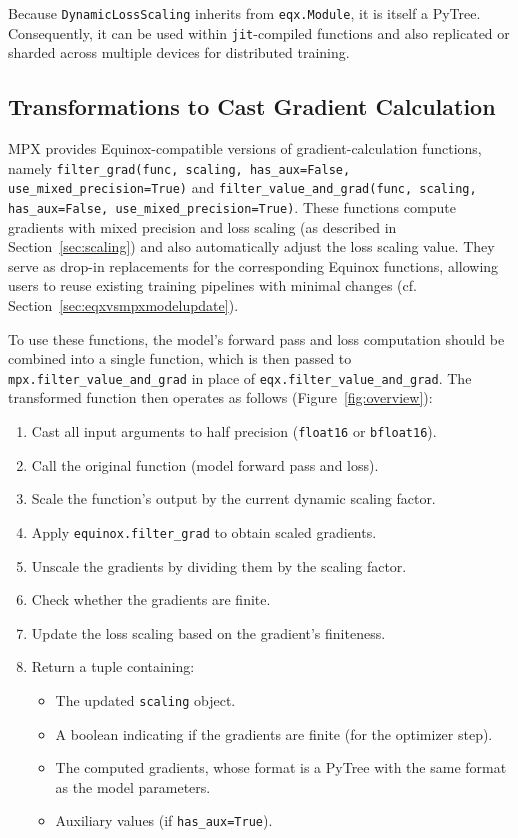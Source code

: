 \documentclass[10pt, a4paper, logo, onecolumn, internal, copyright]{dsme}
\newcommand{\mpx}{\textsc{MPX}}
\begin{document}
Because \texttt{DynamicLossScaling} inherits from \texttt{eqx.Module}, it is itself a PyTree. 
Consequently, it can be used within \texttt{jit}-compiled functions and also replicated or sharded across multiple devices for distributed training.


\subsection{Transformations to Cast Gradient Calculation}
\label{sec:castinggradients}

\mpx{} provides Equinox-compatible versions of gradient-calculation functions, namely \texttt{filter\_grad(func, scaling, has\_aux=False, use\_mixed\_precision=True)} and \texttt{filter\_value\_and\_grad(func, scaling, has\_aux=False, use\_mixed\_precision=True)}. 
These functions compute gradients with mixed precision and loss scaling (as described in Section~\ref{sec:scaling}) and also automatically adjust the loss scaling value. 
They serve as drop-in replacements for the corresponding Equinox functions, allowing users to reuse existing training pipelines with minimal changes (cf. Section~\ref{sec:eqxvsmpxmodelupdate}).

To use these functions, the model's forward pass and loss computation should be combined into a single function, which is then passed to \texttt{mpx.filter\_value\_and\_grad} in place of \texttt{eqx.filter\_value\_and\_grad}. The transformed function then operates as follows (Figure~\ref{fig:overview}):

\begin{enumerate}
    \item Cast all input arguments to half precision (\texttt{float16} or \texttt{bfloat16}).
    \item Call the original function (model forward pass and loss).
    \item Scale the function's output by the current dynamic scaling factor.
    \item Apply \texttt{equinox.filter\_grad} to obtain scaled gradients.
    \item Unscale the gradients by dividing them by the scaling factor.
    \item Check whether the gradients are finite.
    \item Update the loss scaling based on the gradient's finiteness.
    \item Return a tuple containing:
    \begin{itemize}
        \item The updated \texttt{scaling} object.
        \item A boolean indicating if the gradients are finite (for the optimizer step).
        \item The computed gradients, whose format is a PyTree with the same format as the model parameters.
        \item Auxiliary values (if \texttt{has\_aux=True}).
    \end{itemize}
\end{enumerate}
\end{document}
